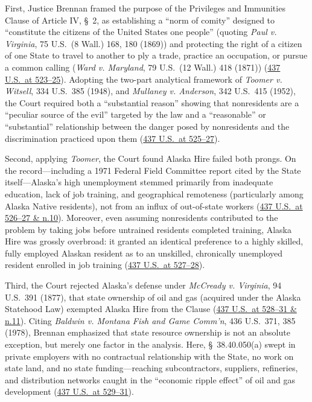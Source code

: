 \documentclass[12pt]{article}
\begin{document}
First, Justice Brennan framed the purpose of the Privileges and Immunities Clause of Article IV, \S\ 2, as establishing a ``norm of comity'' designed to ``constitute the citizens of the United States one people'' (quoting \textit{Paul v. Virginia}, 75 U.S.\ (8 Wall.) 168, 180 (1869)) and protecting the right of a citizen of one State to travel to another to ply a trade, practice an occupation, or pursue a common calling (\textit{Ward v. Maryland}, 79 U.S.\ (12 Wall.) 418 (1871)) (\href{https://supreme.justia.com/cases/federal/us/437/518/}{437 U.S.\ at 523--25}). Adopting the two-part analytical framework of \textit{Toomer v. Witsell}, 334 U.S.\ 385 (1948), and \textit{Mullaney v. Anderson}, 342 U.S.\ 415 (1952), the Court required both a ``substantial reason'' showing that nonresidents are a ``peculiar source of the evil'' targeted by the law and a ``reasonable'' or ``substantial'' relationship between the danger posed by nonresidents and the discrimination practiced upon them (\href{https://supreme.justia.com/cases/federal/us/437/518/}{437 U.S.\ at 525--27}).

Second, applying \textit{Toomer}, the Court found Alaska Hire failed both prongs. On the record---including a 1971 Federal Field Committee report cited by the State itself---Alaska's high unemployment stemmed primarily from inadequate education, lack of job training, and geographical remoteness (particularly among Alaska Native residents), not from an influx of out-of-state workers (\href{https://supreme.justia.com/cases/federal/us/437/518/}{437 U.S.\ at 526--27 \& n.10}). Moreover, even assuming nonresidents contributed to the problem by taking jobs before untrained residents completed training, Alaska Hire was grossly overbroad: it granted an identical preference to a highly skilled, fully employed Alaskan resident as to an unskilled, chronically unemployed resident enrolled in job training (\href{https://supreme.justia.com/cases/federal/us/437/518/}{437 U.S.\ at 527--28}).

Third, the Court rejected Alaska's defense under \textit{McCready v. Virginia}, 94 U.S.\ 391 (1877), that state ownership of oil and gas (acquired under the Alaska Statehood Law) exempted Alaska Hire from the Clause (\href{https://supreme.justia.com/cases/federal/us/437/518/}{437 U.S.\ at 528--31 \& n.11}). Citing \textit{Baldwin v. Montana Fish and Game Comm'n}, 436 U.S.\ 371, 385 (1978), Brennan emphasized that state resource ownership is not an absolute exception, but merely one factor in the analysis. Here, \S\ 38.40.050(a) swept in private employers with no contractual relationship with the State, no work on state land, and no state funding---reaching subcontractors, suppliers, refineries, and distribution networks caught in the ``economic ripple effect'' of oil and gas development (\href{https://supreme.justia.com/cases/federal/us/437/518/}{437 U.S.\ at 529--31}).
\end{document}
